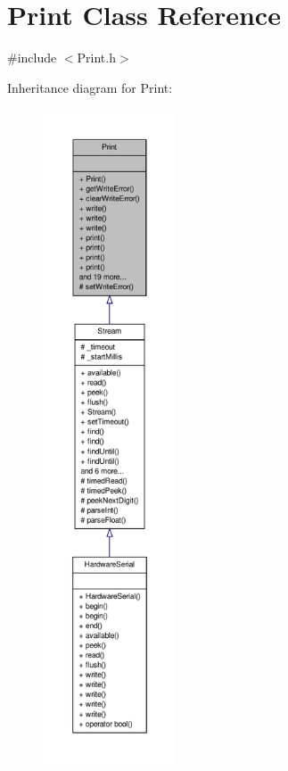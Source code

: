 \hypertarget{class_print}{\section{Print Class Reference}
\label{class_print}
}


{\ttfamily \#include $<$Print.\-h$>$}



Inheritance diagram for Print\-:
\nopagebreak
\begin{figure}[H]
\begin{center}
\leavevmode
\includegraphics[height=550pt]{class_print__inherit__graph}
\end{center}
\end{figure}


